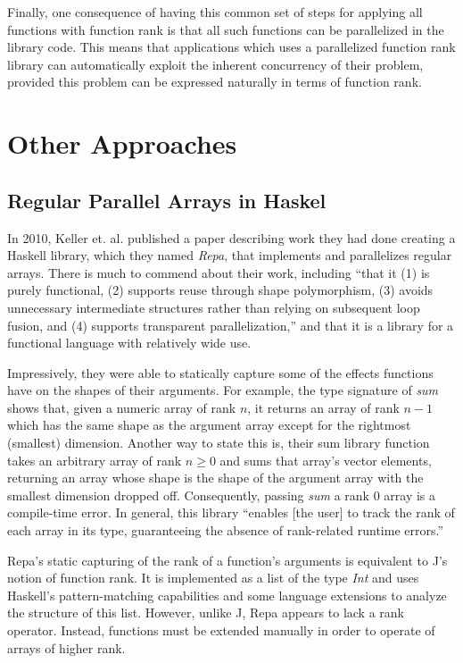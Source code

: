 Finally, one consequence of having this common set of steps for applying all functions with function rank is
that all such functions can be parallelized in the library code.
This means that applications which uses a parallelized function rank library 
can automatically exploit the inherent concurrency of their problem, 
provided this problem can be expressed naturally in terms of function rank.

\section{Other Approaches}
\subsection{Regular Parallel Arrays in Haskel}
\label{repa}
In 2010, Keller et. al. published a paper\cite{dph} 
describing work they had done creating a Haskell library, which they named \textit{Repa}, that implements and parallelizes regular arrays.
There is much to commend about their work, including ``that it (1) is purely
functional, (2) supports reuse through shape polymorphism, (3)
avoids unnecessary intermediate structures rather than relying on
subsequent loop fusion, and (4) supports transparent parallelization,''
and that it is a library for a functional language with relatively wide use.

Impressively, they were able to statically capture some of the effects functions have on the shapes of their arguments.
For example, the type signature of \textit{sum} shows that, given a numeric array of rank $n$, 
it returns an array of rank $n-1$ which has the same shape as the argument array 
except for the rightmost (smallest) dimension.
Another way to state this is, their sum library function takes an arbitrary array of rank $n \ge 0$ 
and sums that array's vector elements, 
returning an array whose shape is the shape of the argument array with the smallest dimension dropped off.
Consequently, passing \textit{sum} a rank 0 array is a compile-time error.
In general, this library ``enables [the user] to track the rank of each array in its type,
guaranteeing the absence of rank-related runtime errors.''

Repa's static capturing of the rank of a function's arguments is equivalent to J's notion of function rank.
It is implemented as a list of the type \textit{Int} and 
uses Haskell's pattern-matching capabilities and some language extensions to analyze the structure of this list.
However, unlike J, Repa appears to lack a rank operator.
Instead, functions must be extended manually in order to operate of arrays of higher rank.

